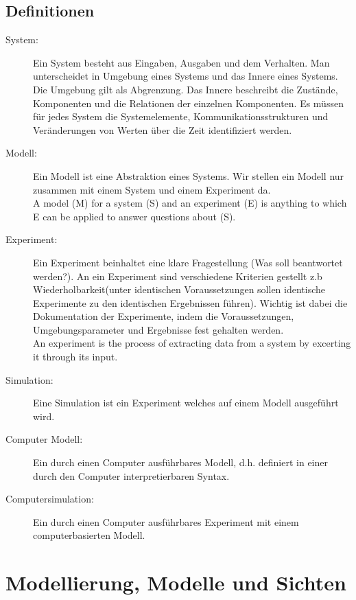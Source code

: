 \documentclass[11pt, fleqn, a4paper, leqno]{scrartcl} %
\begin{document}
	\subsection{Definitionen}
	\begin{description}
		\item[System:] Ein System besteht aus Eingaben, Ausgaben und dem Verhalten. Man unterscheidet in Umgebung eines Systems und das Innere eines Systems. Die Umgebung gilt als Abgrenzung. Das Innere beschreibt die Zustände, Komponenten und die Relationen der einzelnen Komponenten. Es müssen für jedes System die Systemelemente, Kommunikationsstrukturen und Veränderungen von Werten über die Zeit identifiziert werden.
		\item[Modell:] Ein Modell ist eine Abstraktion eines Systems. Wir stellen ein Modell nur zusammen mit einem System und einem Experiment da.\\
		 \glqq A model (M) for a system (S) and an experiment (E) is anything to which E can be applied to answer questions about (S).\grqq
		\item[Experiment:] Ein Experiment beinhaltet eine klare Fragestellung (Was soll beantwortet werden?). An ein Experiment sind verschiedene Kriterien gestellt z.b Wiederholbarkeit(unter identischen Voraussetzungen sollen identische Experimente zu den identischen Ergebnissen führen). Wichtig ist dabei die Dokumentation der Experimente, indem die Voraussetzungen, Umgebungsparameter und Ergebnisse fest gehalten werden.\\
		\glqq An experiment is the process of extracting data from a system by excerting it through its input.\grqq
		\item[Simulation:] Eine Simulation ist ein Experiment welches auf einem Modell ausgeführt wird. 
		\item[Computer Modell:] Ein durch einen Computer ausführbares Modell, d.h. definiert in einer durch den Computer interpretierbaren Syntax.
		\item[Computersimulation:] Ein durch einen Computer ausführbares Experiment mit einem computerbasierten Modell.
	\end{description}
\section{Modellierung, Modelle und Sichten}
\end{document}
